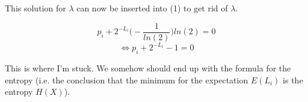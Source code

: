 \documentclass[11pt,a4paper]{article}
\begin{document}
This solution for $\lambda$ can now be inserted into (1) to get rid of $\lambda$.

\begin{equation}
p_i+2^{-L_i} \Big(-\frac{1}{ln(2)}\Big) ln(2) = 0
\end{equation}
\begin{equation}
\Leftrightarrow p_i+2^{-L_i} - 1 = 0
\end{equation}

This is where I'm stuck. We somehow should end up with the formula for the entropy (i.e. the conclusion that the minimum for the expectation $E(L_i)$ is the entropy $H(X)$).

\label{lastpage}
\end{document}
